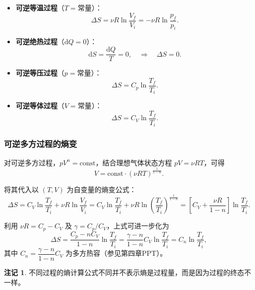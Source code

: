 \documentclass[UTF8]{ctexart}
\theoremstyle{definition}
\newtheorem{remark}{注记}
\begin{document}
\begin{itemize}
\item \textbf{可逆等温过程}（$T=\text{常量}$）：
\begin{equation}
\Delta S=\nu R\ln\frac{V_f}{V_i}=-\nu R\ln\frac{p_f}{p_i}.
\end{equation}

\item \textbf{可逆绝热过程}（$\mathrm{d}Q=0$）：
\begin{equation}
\mathrm{d}S=\frac{\mathrm{d}Q}{T}=0,\quad\Rightarrow\quad\Delta S=0.
\end{equation}

\item \textbf{可逆等压过程}（$p=\text{常量}$）：
\begin{equation}
\Delta S=C_p\ln\frac{T_f}{T_i}.
\end{equation}

\item \textbf{可逆等体过程}（$V=\text{常量}$）：
\begin{equation}
\Delta S=C_V\ln\frac{T_f}{T_i}.
\end{equation}
\end{itemize}

\subsubsection*{可逆多方过程的熵变}

对可逆多方过程，$pV^n=\text{const}$，结合理想气体状态方程 $pV=\nu RT$，可得
\begin{equation}
V=\text{const}\cdot(\nu RT)^{\frac{1}{1-n}}.
\end{equation}

将其代入以 $(T,V)$ 为自变量的熵变公式：
\begin{equation}
\Delta S=C_V\ln\frac{T_f}{T_i}+\nu R\ln\frac{V_f}{V_i}
=C_V\ln\frac{T_f}{T_i}+\nu R\ln\left(\frac{T_f}{T_i}\right)^{\frac{1}{1-n}}
=\left[C_V+\frac{\nu R}{1-n}\right]\ln\frac{T_f}{T_i}.
\end{equation}

利用 $\nu R=C_p-C_V$ 及 $\gamma=C_p/C_V$，上式可进一步化为
\begin{equation}
\Delta S=\frac{C_p-nC_V}{1-n}\ln\frac{T_f}{T_i}
=\frac{\gamma-n}{1-n}C_V\ln\frac{T_f}{T_i}
=C_n\ln\frac{T_f}{T_i},
\end{equation}
其中 $C_n=\dfrac{\gamma-n}{1-n}C_V$ 为多方热容（参见第四章PPT）。

\begin{remark}
不同过程的熵计算公式不同并不表示熵是过程量，而是因为过程的终态不一样。
\end{remark}
\end{document}
